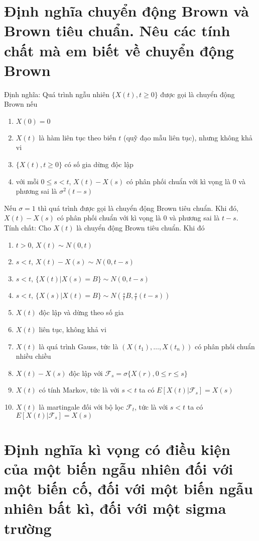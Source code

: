 \documentclass{article}
\begin{document}
\section{Định nghĩa chuyển động Brown và Brown tiêu chuẩn. Nêu các tính chất mà em biết về chuyển động Brown}
Định nghĩa: Quá trình ngẫu nhiên $\{X(t), t \geq 0\}$ được gọi là chuyển động Brown nếu
\begin{enumerate}
    \item $X(0) = 0$
    \item $X(t)$ là hàm liên tục theo biến $t$ (quỹ đạo mẫu liên tục), nhưng không khả vi
    \item $\{X(t), t \geq 0\}$ có số gia dừng độc lập
    \item với mỗi $0 \leq s < t$, $X(t) - X(s)$ có phân phối chuẩn với kì vọng là 0 và phương sai là $\sigma^2 (t - s)$
\end{enumerate}
Nếu $\sigma = 1$ thì quá trình được gọi là chuyển động Brown tiêu chuẩn. Khi đó, $X(t) - X(s)$ có phân phối chuẩn với kì vọng là 0 và phương sai là $t - s$.\\
Tính chất: Cho $X(t)$ là chuyển động Brown tiêu chuẩn. Khi đó
\begin{enumerate}
    \item $t > 0$, $X(t) \sim N(0, t)$
    \item $s < t$, $X(t) - X(s) \sim N(0, t - s)$
    \item $s < t$, $\{X(t) | X(s) = B\} \sim N(0, t - s)$
    \item $s < t$, $\{X(s) | X(t) = B\} \sim N \left( \frac{s}{t} B, \frac{s}{t} (t - s) \right)$
    \item $X(t)$ độc lập và dừng theo số gia
    \item $X(t)$ liên tục, không khả vi
    \item $X(t)$ là quá trình Gauss, tức là $(X(t_1), \ldots, X(t_n))$ có phân phối chuẩn nhiều chiều
    \item $X(t) - X(s)$ độc lập với $\mathcal{F}_s = \sigma \{X(r), 0 \leq r \leq s\}$
    \item $X(t)$ có tính Markov, tức là với $s < t$ ta có $E[X(t) | \mathcal{F}_s] = X(s)$
    \item $X(t)$ là martingale đối với bộ lọc $\mathcal{F}_t$, tức là với $s < t$ ta có $E[X(t) | \mathcal{F}_s] = X(s)$
\end{enumerate}

\section{Định nghĩa kì vọng có điều kiện của một biến ngẫu nhiên đối với một biến cố, đối với một biến ngẫu nhiên bất kì, đối với một sigma trường}
\end{document}
